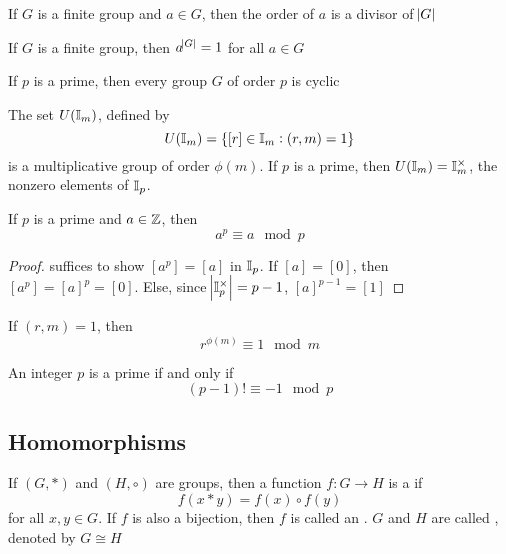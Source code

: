 \documentclass[11pt]{article}
\begin{document}
\begin{corollary}[]
If \(G\) is a finite group and \(a\in G\), then the order of \(a\) is a divisor of
\(\abs{G}\) 
\end{corollary}

\begin{corollary}[]
If \(G\) is a finite group, then \(a^{\abs{G}}=1\) for all \(a\in G\)
\end{corollary}

\begin{corollary}[]
If \(p\) is a prime, then every group \(G\) of order \(p\) is cyclic
\end{corollary}

\begin{proposition}[]
The set \(U(\mathbb{I}_m)\), defined by
\begin{equation*}
 U(\mathbb{I}_m)=\{[r]\in\mathbb{I}_m:(r,m)=1\}
\end{equation*}
is a multiplicative group of order \(\phi(m)\). If \(p\) is a prime, then
\(U(\mathbb{I}_m)=\mathbb{I}_m^{\times}\), the nonzero elements of \(\mathbb{I}_p\).
\end{proposition}

\begin{corollary}[Fermat]
If \(p\) is a prime and \(a\in\mathbb{Z}\), then
\begin{equation*}
a^p\equiv a\mod p
\end{equation*}
\end{corollary}

\begin{proof}
suffices to show \([a^p]=[a]\) in \(\mathbb{I}_p\). If \([a]=[0]\), then \([a^p]=[a]^p=[0]\).
Else, since \(\abs{\mathbb{I}_p^\times}=p-1\), \([a]^{p-1}=[1]\)
\end{proof}


\begin{theorem}[Euler]
If \((r,m)=1\), then
\begin{equation*}
r^{\phi(m)}\equiv 1\mod m
\end{equation*}
\end{theorem}

\begin{theorem}
An integer \(p\) is a prime if and only if
\begin{equation*}
(p-1)!\equiv -1\mod p
\end{equation*}
\end{theorem}
\subsection{Homomorphisms}
\label{sec:orgb4a245c}
\begin{definition}[]
If \((G,*)\) and \((H,\circ)\) are groups, then a function \(f:G\to H\) is a
 if
\begin{equation*}
f(x*y)=f(x)\circ f(y)
\end{equation*}
for all \(x,y\in G\). If \(f\) is also a bijection, then \(f\) is called an
. \(G\) and \(H\) are called , denoted by \(G\cong H\)
\end{definition}
\end{document}
